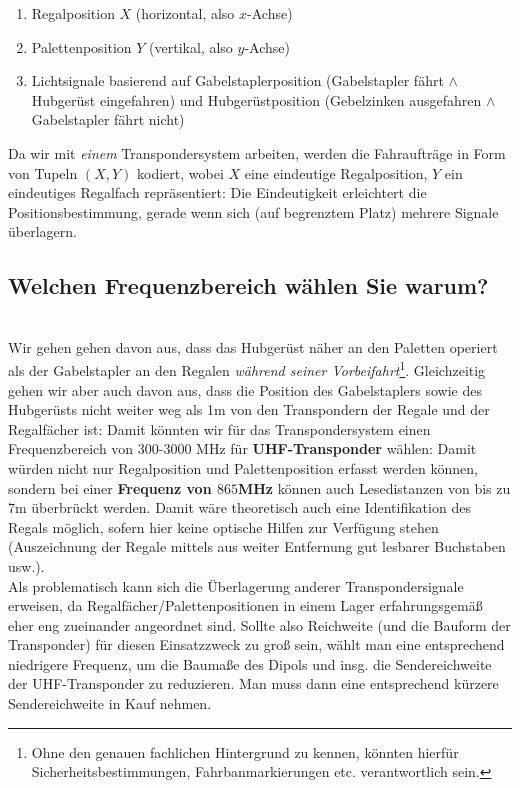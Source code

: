 \begin{enumerate}
    \itemsep0.5em
    \item Regalposition $X$ (horizontal, also $x$-Achse)
    \item Palettenposition $Y$ (vertikal, also $y$-Achse)
    \item Lichtsignale basierend auf Gabelstaplerposition (Gabelstapler fährt $\land$ Hubgerüst eingefahren) und Hubgerüstposition (Gebelzinken ausgefahren $\land$ Gabelstapler fährt nicht)
\end{enumerate}

\noindent
Da wir mit \textit{einem} Transpondersystem arbeiten, werden die Fahraufträge in Form von Tupeln $(X, Y)$ kodiert, wobei $X$ eine eindeutige Regalposition, $Y$ ein eindeutiges Regalfach repräsentiert: Die Eindeutigkeit erleichtert die Positionsbestimmung, gerade wenn sich (auf begrenztem Platz) mehrere Signale überlagern.\\



\subsection*{Welchen Frequenzbereich wählen Sie warum?}\\
Wir gehen gehen davon aus, dass das Hubgerüst näher an den Paletten operiert als der Gabelstapler an den Regalen \textit{während seiner Vorbeifahrt}\footnote{
    Ohne den genauen fachlichen Hintergrund zu kennen, könnten hierfür Sicherheitsbestimmungen, Fahrbanmarkierungen etc. verantwortlich sein.
}.
Gleichzeitig gehen wir aber auch davon aus, dass die Position des Gabelstaplers sowie des Hubgerüsts nicht weiter weg als 1m von den Transpondern der Regale und der Regalfächer ist: Damit könnten wir für das Transpondersystem einen Frequenzbereich von 300-3000 MHz für \textbf{UHF-Transponder} wählen: Damit würden nicht nur Regalposition und Palettenposition erfasst werden können, sondern bei einer \textbf{Frequenz von $865$MHz} können auch Lesedistanzen von bis zu $7$m überbrückt werden.
Damit wäre theoretisch auch eine Identifikation des Regals möglich, sofern hier keine optische Hilfen zur Verfügung stehen (Auszeichnung der Regale mittels aus weiter Entfernung gut lesbarer Buchstaben usw.).\\

\noindent
Als problematisch kann sich die Überlagerung anderer Transpondersignale erweisen, da Regalfächer/Palettenpositionen in einem Lager erfahrungsgemäß eher eng zueinander angeordnet sind.
Sollte also Reichweite (und die Bauform der Transponder) für diesen Einsatzzweck zu groß sein, wählt man eine entsprechend niedrigere Frequenz, um die Baumaße des Dipols und insg. die Sendereichweite der UHF-Transponder zu reduzieren.
Man muss dann eine entsprechend kürzere Sendereichweite in Kauf nehmen.\\

